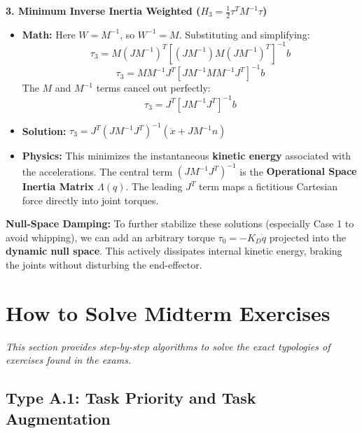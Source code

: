 \documentclass[11pt,a4paper]{article}
\begin{document}
\vspace{2mm}
\textbf{3. Minimum Inverse Inertia Weighted ($H_3 = \frac{1}{2} \tau^T M^{-1} \tau$)}
\begin{itemize}
    \item \textbf{Math:} Here $W = M^{-1}$, so $W^{-1} = M$. Substituting and simplifying:
    $$ \tau_3 = M (JM^{-1})^T \left[ (JM^{-1}) M (JM^{-1})^T \right]^{-1} b $$
    $$ \tau_3 = M M^{-1} J^T \left[ J M^{-1} M M^{-1} J^T \right]^{-1} b $$
    The $M$ and $M^{-1}$ terms cancel out perfectly:
    $$ \tau_3 = J^T \left[ J M^{-1} J^T \right]^{-1} b $$
    \item \textbf{Solution:} $\tau_3 = J^T (J M^{-1} J^T)^{-1} (\ddot{x} + J M^{-1} n)$
    \item \textbf{Physics:} This minimizes the instantaneous \textbf{kinetic energy} associated with the accelerations. The central term $(J M^{-1} J^T)^{-1}$ is the \textbf{Operational Space Inertia Matrix $\Lambda(q)$}. The leading $J^T$ term maps a fictitious Cartesian force directly into joint torques.
\end{itemize}
 

\textbf{Null-Space Damping:} To further stabilize these solutions (especially Case 1 to avoid whipping), we can add an arbitrary torque $\tau_0 = -K_D \dot{q}$ projected into the \textbf{dynamic null space}. This actively dissipates internal kinetic energy, braking the joints without disturbing the end-effector.


\newpage
\section{How to Solve Midterm Exercises}
\textit{This section provides step-by-step algorithms to solve the exact typologies of exercises found in the exams.}

\subsection{Type A.1: Task Priority and Task Augmentation}
\end{document}
